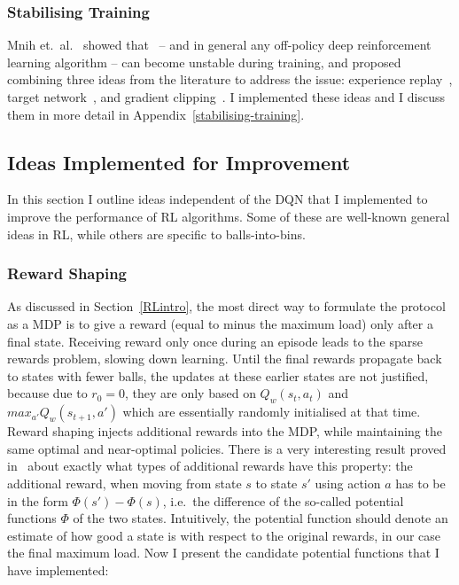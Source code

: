 \subsubsection*{Stabilising Training}

Mnih et.\ al.~\cite{mnih2015dqnstabilitycombined} showed that \DQL\ -- and in general any off-policy deep reinforcement learning algorithm -- can become unstable during training, and proposed combining three ideas from the literature to address the issue: experience replay~\cite{lin1992experiencereplay}, target network~\cite{fan2020target}, and gradient clipping~\cite{mikolov2012gradientclippingoriginal}. I implemented these ideas and I discuss them in more detail in Appendix~\ref{stabilising-training}.


\subsection{Ideas Implemented for Improvement} \label{improvementideas}


In this section I outline ideas independent of the DQN that I implemented to improve the performance of RL algorithms. Some of these are well-known general ideas in RL, while others are specific to balls-into-bins.


\subsubsection*{Reward Shaping} \label{rewardshaping}

As discussed in Section~\ref{RLintro}, the most direct way to formulate the \TwoThinning protocol as a MDP is to give a reward (equal to minus the maximum load) only after a final state. Receiving reward only once during an episode leads to the sparse rewards problem, slowing down learning. Until the final rewards propagate back to states with fewer balls, the updates at these earlier states are not justified, because due to $r_0=0$, they are only based on $Q_w(s_t,a_t)$ and $max_{a'}Q_w(s_{t+1},a')$ which are essentially randomly initialised at that time. Reward shaping injects additional rewards into the MDP, while maintaining the same optimal and near-optimal policies. There is a very interesting result proved in~\cite{ng1999rewardshaping} about exactly what types of additional rewards have this property: the additional reward, when moving from state $s$ to state $s'$ using action $a$ has to be in the form $\Phi(s')-\Phi(s)$, i.e.\ the difference of the so-called potential functions $\Phi$ of the two states. Intuitively, the potential function should denote an estimate of how good a state is with respect to the original rewards, in our case the final maximum load. Now I present the candidate potential functions that I have implemented:

